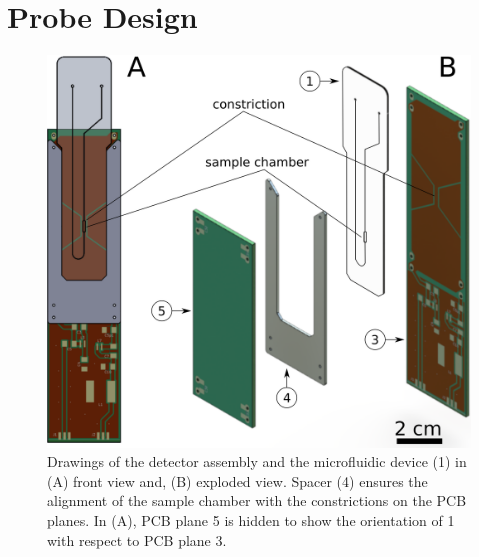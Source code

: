 \documentclass[preprint,5p]{elsarticle}
\begin{document}
\section{Probe Design}
\label{sec:probe-design}
\begin{figure}
\centering
\includegraphics[width=.8\linewidth,keepaspectratio=true]{./figures/ms5n17-tlp-im-190205-rf-device-assembly.png} 
\caption{Drawings of the detector assembly and the microfluidic device (1) in (A) front view and, (B) exploded view. Spacer (4) ensures the alignment of the sample chamber with the constrictions on the PCB planes. In (A), PCB plane 5 is hidden to show the orientation of 1 with respect to PCB plane 3.}
\label{fig:rf-device-assembly}
\end{figure}
\end{document}
